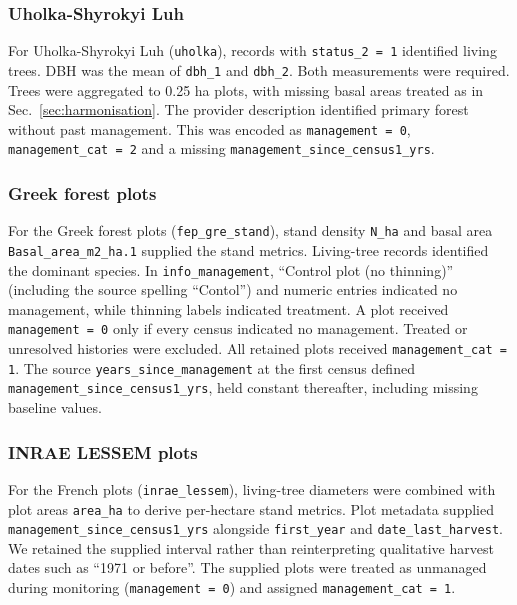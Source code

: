 \documentclass{myreport}
\begin{document}
% 

\subsubsection{Uholka-Shyrokyi Luh}
For Uholka-Shyrokyi Luh (\texttt{uholka}), records with \texttt{status\_2 = 1} identified living trees. DBH was the mean of \texttt{dbh\_1} and \texttt{dbh\_2}. Both measurements were required. Trees were aggregated to 0.25 ha plots, with missing basal areas treated as in Sec.~\ref{sec:harmonisation}. The provider description identified primary forest without past management. This was encoded as \texttt{management = 0}, \texttt{management\_cat = 2} and a missing \texttt{management\_since\_census1\_yrs}.

% 

\subsubsection{Greek forest plots}
For the Greek forest plots (\texttt{fep\_gre\_stand}), stand density \texttt{N\_ha} and basal area \texttt{Basal\_area\_m2\_ha.1} supplied the stand metrics. Living-tree records identified the dominant species. In \texttt{info\_management}, ``Control plot (no thinning)'' (including the source spelling ``Contol'') and numeric entries indicated no management, while thinning labels indicated treatment. A plot received \texttt{management = 0} only if every census indicated no management. Treated or unresolved histories were excluded. All retained plots received \texttt{management\_cat = 1}. The source \texttt{years\_since\_management} at the first census defined \texttt{management\_since\_census1\_yrs}, held constant thereafter, including missing baseline values.

% 

\subsubsection{INRAE LESSEM plots}
For the French plots (\texttt{inrae\_lessem}), living-tree diameters were combined with plot areas \texttt{area\_ha} to derive per-hectare stand metrics. Plot metadata supplied \texttt{management\_since\_census1\_yrs} alongside \texttt{first\_year} and \texttt{date\_last\_harvest}. We retained the supplied interval rather than reinterpreting qualitative harvest dates such as ``1971 or before''. The supplied plots were treated as unmanaged during monitoring (\texttt{management = 0}) and assigned \texttt{management\_cat = 1}.
\end{document}

